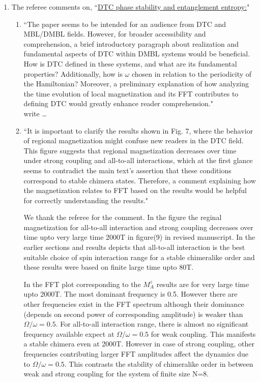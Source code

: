 \documentclass[aps,prb,reprint,showpacs,floatfix,superscriptaddress, onecolumn, nofootinbib, 10pt]{revtex4-2}
\newcommand{\response}[1]{{\color{black}#1}} %
\newcommand{\comment}[1]{{\color{blue}#1}} %
\begin{document}
\begin{enumerate}
\begin{enumerate}
		\item The referee comments on, \comment{``\underline{DTC phase stability and entanglement entropy:}"}
		\begin{enumerate}
			\item \comment{``The paper seems to be intended for an audience from DTC and MBL/DMBL fields. However, for broader accessibility and comprehension, a brief introductory paragraph about realization and fundamental aspects of DTC within DMBL
			systems would be beneficial. How is DTC defined in these systems, and what are its fundamental properties? Additionally, how is $\omega$ chosen in relation to the periodicity of the Hamiltonian? Moreover, a preliminary explanation of how analyzing the time evolution of local magnetization and its FFT contributes to defining DTC would greatly enhance reader comprehension."}\\
			
			\response{ write \dots {}
			}
			\item \comment{``It is important to clarify the results shown in Fig. 7, where the behavior of regional magnetization might confuse new readers in the DTC field. This figure suggests that regional magnetization decreases over time under strong coupling and all-to-all interactions, which at the first glance seems to contradict the main text’s assertion that these conditions correspond to stable chimera states. Therefore, a comment  explaining how the magnetization relates to FFT based on the results would be helpful for correctly understanding the results."}\\
			
			\response{
			We thank the referee for the comment. In the figure the reginal magnetization for all-to-all interaction and strong coupling  decreases over time upto very large time 2000T in figure(9) in revised manuscript. In the earlier sections and results depicts that all-to-all interaction is the best suitable choice of spin interaction range for a stable chimeralike order and these results were based on finite large time upto 80T.
			
			In the FFT plot corresponding to the $M^z_A$ results are for very large time upto 2000T. The most dominant frequency is 0.5. However there are other frequencies exist in the FFT spectrum although their dominance (depends on second power of corresponding amplitude) is weaker than $\Omega/\omega=0.5$. For all-to-all interaction range, there is almost no significant frequency available expect at $\Omega/\omega=0.5$ for weak coupling. This manifests a stable chimera even at 2000T. However in case of strong coupling, other frequencies contributing larger FFT amplitudes affect the dynamics due to  $\Omega/\omega=0.5$. This contrasts the stability of chimeralike order in between  weak and strong coupling for the system of finite size N=8.
			
}
\end{enumerate}
\end{enumerate}
\end{enumerate}
\end{document}
